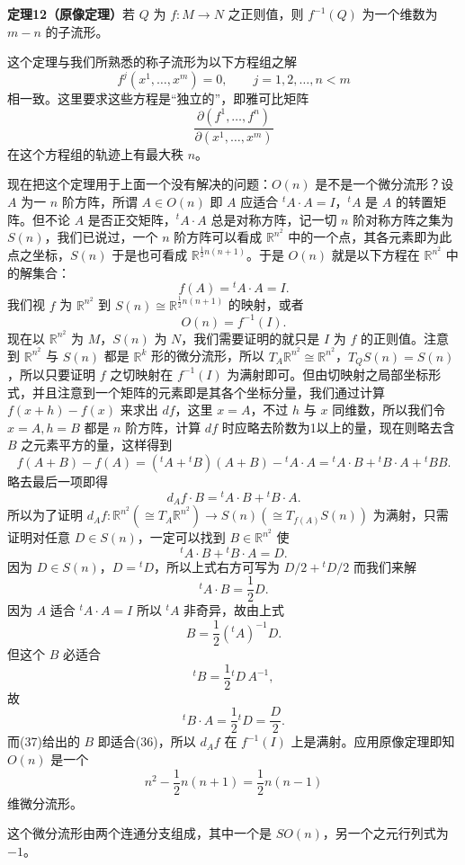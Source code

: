 \noindent\textbf{定理12（原像定理）}\quad 若 $Q$ 为 $f:M\to N$ 之正则值，则 $f^{-1}(Q)$ 为一个维数为 $m-n$ 的子流形。

这个定理与我们所熟悉的称子流形为以下方程组之解
\[
 f^j(x^1,\ldots,x^m)=0,
 \qquad j=1,2,\ldots,n<m
\]
相一致。这里要求这些方程是“独立的”，即雅可比矩阵
\[
 \frac{\partial(f^1,\ldots,f^n)}{\partial(x^1,\ldots,x^m)}
\]
在这个方程组的轨迹上有最大秩 $n$。

现在把这个定理用于上面一个没有解决的问题：$O(n)$ 是不是一个微分流形？设 $A$ 为一 $n$ 阶方阵，所谓 $A\in O(n)$ 即 $A$ 应适合 ${}^tA\cdot A=I$，${}^tA$ 是 $A$ 的转置矩阵。但不论 $A$ 是否正交矩阵，${}^tA\cdot A$ 总是对称方阵，记一切 $n$ 阶对称方阵之集为 $S(n)$，我们已说过，一个 $n$ 阶方阵可以看成 $\mathbb R^{n^2}$ 中的一个点，其各元素即为此点之坐标，$S(n)$ 于是也可看成 $\mathbb R^{\frac12n(n+1)}$。于是 $O(n)$ 就是以下方程在 $\mathbb R^{n^2}$ 中的解集合：
\begin{equation}
 f(A)={}^tA\cdot A=I.
 \tag{34}
\end{equation}
我们视 $f$ 为 $\mathbb R^{n^2}$ 到 $S(n)\cong\mathbb R^{\frac12n(n+1)}$ 的映射，或者
\[
 O(n)=f^{-1}(I).
\]
现在以 $\mathbb R^{n^2}$ 为 $M$，$S(n)$ 为 $N$，我们需要证明的就只是 $I$ 为 $f$ 的正则值。注意到 $\mathbb R^{n^2}$ 与 $S(n)$ 都是 $\mathbb R^k$ 形的微分流形，所以 $T_A\mathbb R^{n^2}\cong\mathbb R^{n^2}$，$T_QS(n)=S(n)$，所以只要证明 $f$ 之切映射在 $f^{-1}(I)$ 为满射即可。但由切映射之局部坐标形式，并且注意到一个矩阵的元素即是其各个坐标分量，我们通过计算 $f(x+h)-f(x)$ 来求出 $df$，这里 $x=A$，不过 $h$ 与 $x$ 同维数，所以我们令 $x=A,h=B$ 都是 $n$ 阶方阵，计算 $df$ 时应略去阶数为1以上的量，现在则略去含 $B$ 之元素平方的量，这样得到
\[
 f(A+B)-f(A)=({}^tA+{}^tB)(A+B)-{}^tA\cdot A
 ={}^tA\cdot B+{}^tB\cdot A+{}^tB B.
\]
略去最后一项即得
\begin{equation}
 d_Af\cdot B={}^tA\cdot B+{}^tB\cdot A.
 \tag{35}
\end{equation}
所以为了证明 $d_Af:\mathbb R^{n^2}(\cong T_A\mathbb R^{n^2})\to S(n)(\cong T_{f(A)}S(n))$ 为满射，只需证明对任意 $D\in S(n)$，一定可以找到 $B\in\mathbb R^{n^2}$ 使
\begin{equation}
 {}^tA\cdot B+{}^tB\cdot A=D.
 \tag{36}
\end{equation}
因为 $D\in S(n)$，$D={}^tD$，所以上式右方可写为 $D/2+{}^tD/2$ 而我们来解
\[
 {}^tA\cdot B=\frac12D.
\]
因为 $A$ 适合 ${}^tA\cdot A=I$ 所以 ${}^tA$ 非奇异，故由上式
\begin{equation}
 B=\frac12({}^tA)^{-1}D.
 \tag{37}
\end{equation}
但这个 $B$ 必适合
\[
 {}^tB=\frac12{}^tD\,A^{-1},
\]
故
\[
 {}^tB\cdot A=\frac12{}^tD=\frac D2.
\]
而(37)给出的 $B$ 即适合(36)，所以 $d_Af$ 在 $f^{-1}(I)$ 上是满射。应用原像定理即知 $O(n)$ 是一个
\[
 n^2-\frac12n(n+1)=\frac12n(n-1)
\]
维微分流形。

这个微分流形由两个连通分支组成，其中一个是 $SO(n)$，另一个之元行列式为 $-1$。
